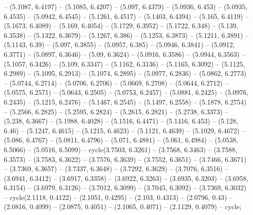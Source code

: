 {  -- (5.1087, 6.4197) -- (5.1085, 6.4207) -- (5.097, 6.4379) -- (5.0936, 6.453) 
  -- (5.0935, 6.4535) -- (5.0942, 6.4545) -- (5.1261, 6.4517) -- (5.1403, 
  6.4394) -- (5.165, 6.4119) -- (5.1673, 6.4089) -- (5.169, 6.4054) -- (5.1729, 
  6.3952) -- (5.1722, 6.348) -- (5.139, 6.3538) -- (5.1322, 6.3679) -- (5.1267, 
  6.386) -- (5.1253, 6.3873) -- (5.1211, 6.3891) -- (5.1143, 6.39) -- (5.097, 
  6.3855) -- (5.0957, 6.385) -- (5.0946, 6.3841) -- (5.0912, 6.3771) -- (5.0897,
   6.3646) -- (5.09, 6.3624) -- (5.0916, 6.3586) -- (5.0944, 6.3563) -- (5.1057,
   6.3426) -- (5.109, 6.3347) -- (5.1162, 6.3136) -- (5.1165, 6.3092) -- 
  (5.1125, 6.2989) -- (5.1095, 6.2913) -- (5.1074, 6.2895) -- (5.0977, 6.2836) 
  -- (5.0862, 6.2773) -- (5.0744, 6.2714) -- (5.0706, 6.2706) -- (5.0669, 
  6.2708) -- (5.0644, 6.2712) -- (5.0575, 6.2571) -- (5.0643, 6.2505) -- 
  (5.0753, 6.2457) -- (5.0881, 6.2425) -- (5.0976, 6.2435) -- (5.1215, 6.2476) 
  -- (5.1467, 6.2545) -- (5.1497, 6.2558) -- (5.1878, 6.2754) -- (5.2566, 
  6.2825) -- (5.2595, 6.2824) -- (5.2615, 6.2821) -- (5.2738, 6.3373) -- (5.238,
   6.3667) -- (5.1988, 6.4028) -- (5.1516, 6.4471) -- (5.1416, 6.453) -- (5.128,
   6.46) -- (5.1247, 6.4615) -- (5.1215, 6.4623) -- (5.1121, 6.4639) -- (5.1029,
   6.4672) -- (5.086, 6.4767) -- (5.0811, 6.4796) -- (5.071, 6.4881) -- (5.061, 
  6.4984) -- (5.0538, 6.5066) -- (5.0516, 6.5099) -- cycle(3.7503, 6.3261) -- 
  (3.7568, 6.3463) -- (3.7588, 6.3573) -- (3.7583, 6.3622) -- (3.7576, 6.3639) 
  -- (3.7552, 6.3651) -- (3.7466, 6.3671) -- (3.7369, 6.3657) -- (3.7337, 
  6.3648) -- (3.7292, 6.3629) -- (3.7076, 6.3516) -- (3.6941, 6.3412) -- 
  (3.6917, 6.3358) -- (3.6922, 6.3263) -- (3.6935, 6.3203) -- (3.6958, 6.3154) 
  -- (3.6979, 6.3126) -- (3.7012, 6.3099) -- (3.7045, 6.3092) -- (3.7369, 
  6.3032) -- cycle(2.1118, 0.4122) -- (2.1051, 0.4295) -- (2.103, 0.4313) -- 
  (2.0796, 0.43) -- (2.0816, 0.4099) -- (2.0875, 0.4051) -- (2.1065, 0.4071) -- 
  (2.1129, 0.4079) -- cycle;

}